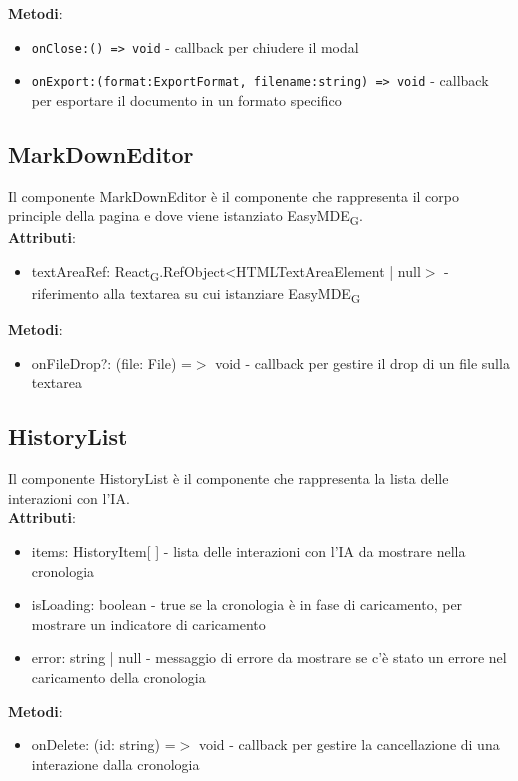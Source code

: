 \documentclass[11pt,a4paper]{article}
\newcommand{\gls}[1]{#1\textsubscript{G}}
\begin{document}
\textbf{Metodi}:
\begin{itemize}
    \item \texttt{onClose:() => void} - callback per chiudere il modal
    \item \texttt{onExport:(format:ExportFormat, filename:string) => void} - callback per esportare il documento in un formato specifico
\end{itemize}

\subsection{MarkDownEditor}
Il componente MarkDownEditor è il componente che rappresenta il corpo principle della pagina e dove viene istanziato \gls{EasyMDE}.\\

\textbf{Attributi}:
\begin{itemize}
    \item textAreaRef: \gls{React}.RefObject<HTMLTextAreaElement | null$>$ - riferimento alla textarea su cui istanziare \gls{EasyMDE}
    
\end{itemize}

\textbf{Metodi}:
\begin{itemize}
    \item onFileDrop?: (file: File) =$>$ void - callback per gestire il drop di un file sulla textarea
\end{itemize}

\subsection{HistoryList}
Il componente HistoryList è il componente che rappresenta la lista delle interazioni con l'IA.\\

\textbf{Attributi}:
\begin{itemize}
    \item items: HistoryItem[ ] - lista delle interazioni con l'IA da mostrare nella cronologia
    \item isLoading: boolean - true se la cronologia è in fase di caricamento, per mostrare un indicatore di caricamento
    \item error: string | null - messaggio di errore da mostrare se c'è stato un errore nel caricamento della cronologia
\end{itemize}

\textbf{Metodi}:
\begin{itemize}
    \item onDelete: (id: string) =$>$ void - callback per gestire la cancellazione di una interazione dalla cronologia
\end{itemize}
\end{document}
